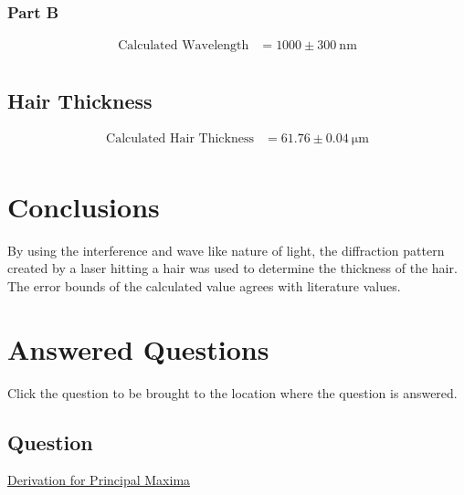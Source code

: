 \documentclass{report}
\begin{document}
\subsection*{Part B}
\begin{equation*}
    \begin{aligned}
        \text{Calculated Wavelength} & = 1000 \pm 300 \ \mathrm{nm} \\
    \end{aligned}
\end{equation*}

\section*{Hair Thickness}
\begin{equation*}
    \begin{aligned}
        \text{Calculated Hair Thickness} & = 61.76 \pm 0.04 \ \mathrm{\mu m} \\
    \end{aligned}
\end{equation*}



\chapter{Conclusions}

By using the interference and wave like nature of light, the diffraction pattern created by a laser hitting a hair was used to determine the thickness of the hair. The error bounds of the calculated value agrees with literature values.  




\chapter{Answered Questions}
Click the question to be brought to the location where the question is answered.

\section{Question}
\hyperref[Question]{Derivation for Principal Maxima}
\end{document}
